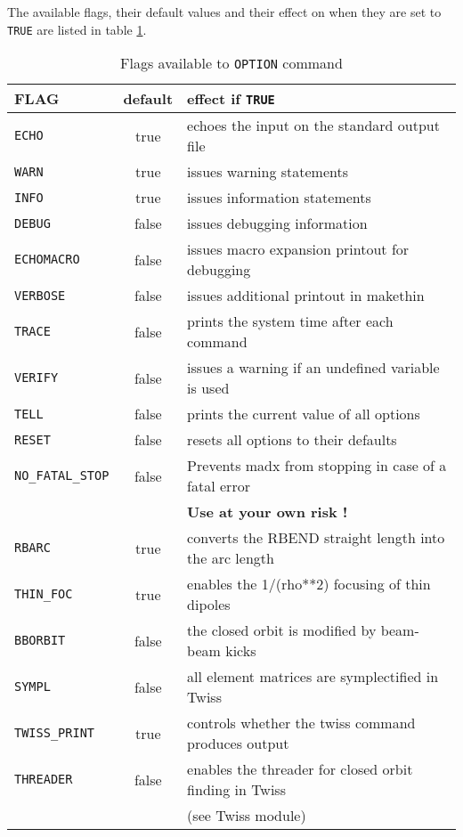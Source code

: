 The available flags, their default values and their effect on \madx when
they are set to {\tt TRUE} are listed in table \ref{table:options}.

\begin{table}[ht]
  \caption{Flags available to {\tt OPTION} command}
  \vspace{1ex}
  \begin{center}
    \label{table:options}
    \begin{tabular}{|l|c|l|}
     \hline
     {\bf FLAG }  & {\bf default} & {\bf effect if {\tt TRUE}} \\
     \hline
     {\tt ECHO}  & true  & echoes the input on the standard output file \\
     {\tt WARN}  & true  & issues warning statements\\
     {\tt INFO}  & true  & issues information statements\\
     {\tt DEBUG} & false & issues debugging information \\
     {\tt ECHOMACRO} & false & issues macro expansion printout for debugging \\
     {\tt VERBOSE} & false & issues additional printout in makethin \\
     {\tt TRACE}   & false & prints the system time after each command \\
     {\tt VERIFY}  & false & issues a warning if an undefined variable is used 
     \\
     \hline
     {\tt TELL}  & false & prints the current value of all options \\
     {\tt RESET} & false & resets all options to their defaults \\
     \hline
     {\tt NO\_FATAL\_STOP} & false & Prevents madx from stopping in case of a 
     fatal error \\
                              &       & {\bf Use at your own risk !} \\
     \hline
     {\tt RBARC}     & true & converts the RBEND straight length into the arc 
     length \\
     {\tt THIN\_FOC} & true & enables the 1/(rho**2) focusing of thin dipoles \\
     {\tt BBORBIT}   & false & the closed orbit is modified by beam-beam kicks 
     \\
     {\tt SYMPL}     & false & all element matrices are symplectified in Twiss 
     \\
     {\tt TWISS\_PRINT} & true & controls whether the twiss command produces 
     output \\
     {\tt THREADER}  & false & enables the threader for closed orbit finding in 
     Twiss \\ 
                        &       & (see Twiss module) \\ 
     \hline
     \end{tabular}
   \end{center}
\end{table}

